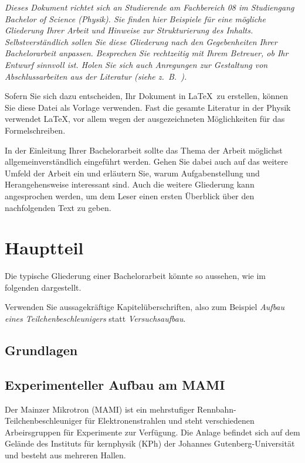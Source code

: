 \documentclass[a4paper,11pt,oneside,final,german,openbib,pdftex]{scrbook}
\begin{document}
{\em Dieses Dokument richtet sich an Studierende am Fachbereich 08 im 
Studiengang Bachelor of Science (Physik). Sie finden hier Beispiele 
f\"ur eine m\"ogliche Gliederung Ihrer Arbeit und Hinweise zur 
Strukturierung des Inhalts. Selbstverst\"andlich sollen Sie diese 
Gliederung nach den Gegebenheiten Ihrer Bachelorarbeit anpassen. 
Besprechen Sie rechtzeitig mit Ihrem Betreuer, ob Ihr Entwurf sinnvoll 
ist. Holen Sie sich auch Anregungen zur Gestaltung von Abschlussarbeiten 
aus der Literatur (siehe z.\ B.\ \cite{EbelBliefert}).
\medskip

Sofern Sie sich dazu entscheiden, Ihr Dokument in \LaTeX\ zu erstellen, 
k\"onnen Sie diese Datei als Vorlage verwenden. Fast die gesamte 
Literatur in der Physik verwendet \LaTeX, vor allem wegen der 
ausgezeichneten M\"oglichkeiten f\"ur das Formelschreiben.
}
\bigskip

In der Einleitung Ihrer Bachelorarbeit sollte das Thema der Arbeit 
m\"oglichst allgemeinverst\"andlich eingef\"uhrt werden. Gehen Sie 
dabei auch auf das weitere Umfeld der Arbeit ein und erl\"autern Sie, 
warum Aufgabenstellung und Herangehensweise interessant sind. Auch 
die weitere Gliederung kann angesprochen werden, um dem Leser einen 
ersten \"Uberblick \"uber den nachfolgenden Text zu geben.

\chapter{Hauptteil}

Die typische Gliederung einer Bachelorarbeit k\"onnte so aussehen, 
wie im folgenden dargestellt. 
\medskip

Verwenden Sie aussagekr\"aftige Kapitel\"uberschriften, also zum 
Beispiel {\em Aufbau eines Teilchenbeschleunigers} statt 
{\em Versuchsaufbau}.


\section{Grundlagen}
\section{Experimenteller Aufbau am MAMI}

Der Mainzer Mikrotron (MAMI) ist ein mehrstufiger Rennbahn-Teilchenbeschleuniger für Elektronenstrahlen und steht verschiedenen Arbeirsgruppen für Experimente zur Verfügung. Die Anlage befindet sich auf dem Gelände des Instituts für kernphysik (KPh) der Johannes Gutenberg-Universität und besteht aus mehreren Hallen. 
\end{document}
